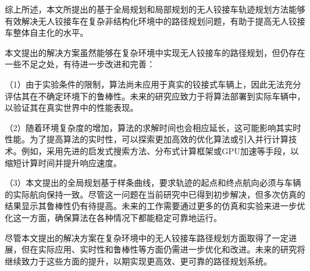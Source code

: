 \documentclass[master,academic]{ysuthesis} %
\begin{document}
	综上所述，本文所提出的基于全局规划和局部规划的无人铰接车轨迹规划方法能够有效解决无人铰接车在复杂非结构化环境中的路径规划问题，有助于提高无人铰接车整体自主化的水平。

	本文提出的解决方案虽然能够在复杂环境中实现无人铰接车的路径规划，但仍存在一些不足之处，有待进一步改进和完善：

	（1）由于实验条件的限制，算法尚未应用于真实的铰接式车辆上，因此无法充分评估其在不确定环境下的鲁棒性。未来的研究应致力于将算法部署到实际车辆中，以验证其在真实世界中的性能表现。

	（2）随着环境复杂度的增加，算法的求解时间也会相应延长，这可能影响其实时性能。为了提高算法的实时性，可以探索更加高效的优化算法或引入并行计算技术。例如，采用先进的启发式搜索方法、分布式计算框架或GPU加速等手段，以缩短计算时间并提升响应速度。

	（3）本文提出的全局规划基于样条曲线，要求轨迹的起点和终点航向必须与车辆的实际航向保持一致。尽管这一问题在当前研究中已得到初步解决，但多次仿真的结果显示其鲁棒性仍有待提高。未来的工作需要通过更多的仿真和实验来进一步优化这一方面，确保算法在各种情况下都能稳定可靠地运行。

	尽管本文提出的解决方案在复杂环境中的无人铰接车路径规划方面取得了一定进展，但在实际应用、实时性和鲁棒性等方面仍需进一步优化和改进。未来的研究将继续致力于这些方面的提升，以期实现更高效、更可靠的路径规划系统。
																					  





	\acknowledgement{
		
	}
\end{document}
